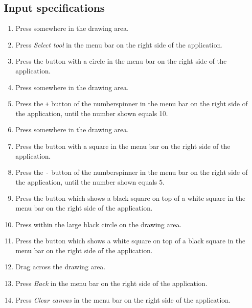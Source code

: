 \subsection*{Input specifications}
\begin{enumerate}
\item Press somewhere in the drawing area.
\item Press \emph{Select tool} in the menu bar on the right side of the application.
\item Press the button with a circle in the menu bar on the right side of the application.
\item Press somewhere in the drawing area.
\item Press the \texttt{+} button of the numberspinner in the menu bar on the right side of the application, until the number shown equals 10.

\item Press somewhere in the drawing area.
\item Press the button with a square in the menu bar on the right side of the application.
\item Press the \texttt{-} button of the numberspinner in the menu bar on the right side of the application, until the number shown equals 5.
\item Press the button which shows a black square on top of a white square in the menu bar on the right side of the application. 
\item Press within the large black circle on the drawing area.

\item Press the button which shows a white square on top of a black square in the menu bar on the right side of the application. 
\item Drag across the drawing area.
\item Press \emph{Back} in the menu bar on the right side of the application.
\item Press \emph{Clear canvas} in the menu bar on the right side of the application. 
\end{enumerate}

